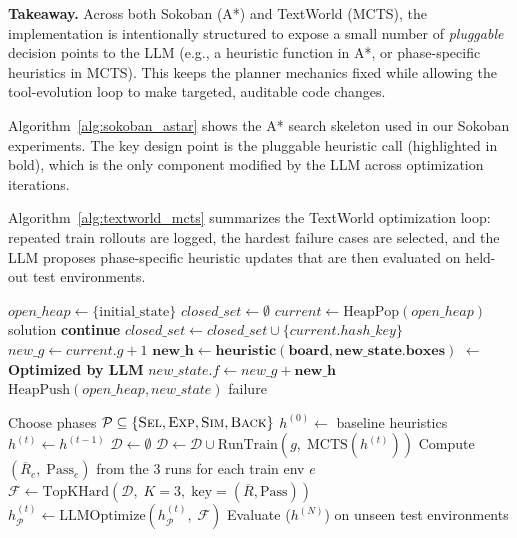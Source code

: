 \documentclass{article}
\begin{document}
\noindent\textbf{Takeaway.} Across both Sokoban (A*) and TextWorld (MCTS), the implementation is intentionally structured to expose a small number of \emph{pluggable} decision points to the LLM (e.g., a heuristic function in A*, or phase-specific heuristics in MCTS). This keeps the planner mechanics fixed while allowing the tool-evolution loop to make targeted, auditable code changes.

\noindent Algorithm~\ref{alg:sokoban_astar} shows the A* search skeleton used in our Sokoban experiments. The key design point is the pluggable heuristic call (highlighted in bold), which is the only component modified by the LLM across optimization iterations.

\noindent Algorithm~\ref{alg:textworld_mcts} summarizes the TextWorld optimization loop: repeated train rollouts are logged, the hardest failure cases are selected, and the LLM proposes phase-specific heuristic updates that are then evaluated on held-out test environments.


\begin{algorithm}[htbp]
\caption{Sokoban A* Search with Pluggable Heuristic}
\label{alg:sokoban_astar}
\begin{algorithmic}[1]
\STATE $open\_heap \gets \{ \text{initial\_state} \}$
\STATE $closed\_set \gets \emptyset$
    \STATE $current \gets \text{HeapPop}(open\_heap)$
        \RETURN solution
    \ENDIF
        \STATE \textbf{continue}
    \ENDIF
    \STATE $closed\_set \gets closed\_set \cup \{current.hash\_key\}$
        \STATE $new\_g \gets current.g + 1$
        \STATE $\mathbf{new\_h \gets heuristic(board, new\_state.boxes)}$ \hfill $\leftarrow$ \textbf{Optimized by LLM}
        \STATE $new\_state.f \gets new\_g + \mathbf{new\_h}$
        \STATE $\text{HeapPush}(open\_heap, new\_state)$
    \ENDFOR
\ENDWHILE
\RETURN failure
\end{algorithmic}
\end{algorithm}

\begin{algorithm}[htbp]
\caption{TextWorld MCTS with Iterative LLM Heuristic Optimization}
\label{alg:textworld_mcts}
\begin{algorithmic}[1]
\STATE Choose phases $\mathcal{P} \subseteq \{\textsc{Sel},\textsc{Exp},\textsc{Sim},\textsc{Back}\}$
\STATE $h^{(0)} \gets$ baseline heuristics
  \STATE $h^{(t)} \gets h^{(t-1)}$
  \STATE $\mathcal{D} \gets \emptyset$
      \STATE $\mathcal{D} \gets \mathcal{D} \cup \text{RunTrain}(g,\; \text{MCTS}(h^{(t)}))$
    \ENDFOR
  \ENDFOR
  \STATE Compute $(\overline{R}_e,\; \text{Pass}_e)$ from the 3 runs for each train env $e$
  \STATE $\mathcal{F} \gets \text{TopKHard}(\mathcal{D},\; K{=}3,\; \text{key}{=}(\overline{R},\text{Pass}))$
  \STATE $h^{(t)}_{\mathcal{P}} \gets \text{LLMOptimize}(h^{(t)}_{\mathcal{P}},\; \mathcal{F})$
\ENDFOR
\STATE Evaluate ($h^{(N)}$) on unseen test environments
\end{algorithmic}
\end{algorithm}
\end{document}
